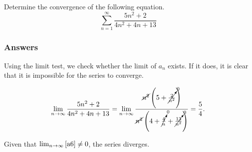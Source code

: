 \documentclass{article}
\begin{document}
Determine the convergence of the following equation.
\begin{equation}\label{a6}
\sum_{n=1}^{\infty} \frac{5n^2+2}{4n^2+4n+13}
\end{equation}

\subsubsection*{Answers}

Using the limit test, we check whether the limit of $a_n$ exists. If it does, it is clear that it is impossible for the series to converge.

\begin{align*}
\lim_{n\to\infty} \frac{5n^2+2}{4n^2+4n+13} = \lim_{n\to\infty} \frac{ \cancel{n^2}\left(5+\cancelto{0}{\frac{2}{n^2}}\right)}{\cancel{n^2}\left(4+\cancelto{0}{\frac{4}{n}}+\cancelto{0}{\frac{13}{n^2}}\right)} = \frac{5}{4}.
\end{align*}

Given that $\lim_{n\to\infty} \ref{a6} \neq 0$, the series diverges.
\par
\end{document}
